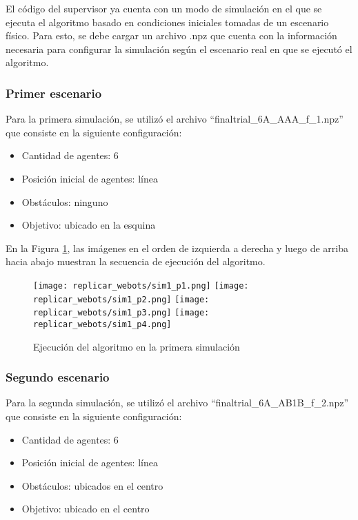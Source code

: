 El código del supervisor ya cuenta con un modo de simulación en el que se ejecuta el algoritmo basado en condiciones iniciales tomadas de un escenario físico. Para esto, se debe cargar un archivo .npz que cuenta con la información necesaria para configurar la simulación según el escenario real en que se ejecutó el algoritmo.

\subsubsection{Primer escenario}
Para la primera simulación, se utilizó el archivo ``finaltrial\_6A\_AAA\_f\_1.npz'' que consiste en la siguiente configuración:

\begin{itemize}
	\item Cantidad de agentes: 6
	\item Posición inicial de agentes: línea
	\item Obstáculos: ninguno
	\item Objetivo: ubicado en la esquina
\end{itemize}

En la Figura \ref{fig:primera_simulacion}, las imágenes en el orden de izquierda a derecha y luego de arriba hacia abajo muestran la secuencia de ejecución del algoritmo.

\begin{figure}[H]
	\centering
	\texttt{[image: replicar\_webots/sim1\_p1.png]}
	\texttt{[image: replicar\_webots/sim1\_p2.png]}
	\texttt{[image: replicar\_webots/sim1\_p3.png]}
	\texttt{[image: replicar\_webots/sim1\_p4.png]}
	\caption{Ejecución del algoritmo en la primera simulación}
	\label{fig:primera_simulacion}
\end{figure}

\subsubsection{Segundo escenario}
Para la segunda simulación, se utilizó el archivo ``finaltrial\_6A\_AB1B\_f\_2.npz'' que consiste en la siguiente configuración:

\begin{itemize}
	\item Cantidad de agentes: 6
	\item Posición inicial de agentes: línea
	\item Obstáculos: ubicados en el centro
	\item Objetivo: ubicado en el centro
\end{itemize}

